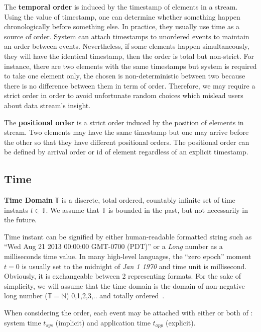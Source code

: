The \textbf{temporal order} is induced by the timestamp of elements in a stream. Using the value of timestamp, one can determine whether something happen chronologically before something else. In practice, they usually use time as a source of order. System can attach timestamps to unordered events to maintain an order between events. Nevertheless, if some elements happen simultaneously, they will have the identical timestamp, then the order is total but non-strict. For instance, there are two elements with the same timestamps but system is required to take one element only, the chosen is non-deterministic between two because there is no difference between them in term of order. Therefore, we may require a strict order in order to avoid unfortunate random choices which mislead users about data stream's insight.

The \textbf{positional order} is a strict order induced by the position of elements in stream. Two elements  may have the same timestamp but one may arrive before the other so that they have different positional orders. The positional order can be defined by arrival order or id of element regardless of an explicit timestamp. 



\subsection*{Time}
\textbf{Time Domain} $\mathbb{T}$ is a discrete, total ordered, countably infinite set of time instants $t \in \mathbb{T}$. We assume that $\mathbb{T}$ is bounded in the past, but not necessarily in the future.

Time instant can be signified by either human-readable formatted string  such as ``Wed Aug 21 2013 00:00:00 GMT-0700 (PDT)'' or a \textit{Long} number as a milliseconds time value. In many high-level languages, the ``zero epoch'' moment $t = 0$ is usually set to the midnight of \textit{Jan 1 1970} and time unit is millisecond. Obviously, it is exchangeable between 2 representing formats.   
For the sake of simplicity, we will assume that the time domain is the domain of non-negative long number ($\mathbb{T} = \mathbb{N}$) {0,1,2,3,..} and totally ordered~\citep{Dindar:2013}.

When considering the order, each event may be attached with either or both of : system time $t_{sys}$ (implicit) and application time $t_{app}$ (explicit). 


